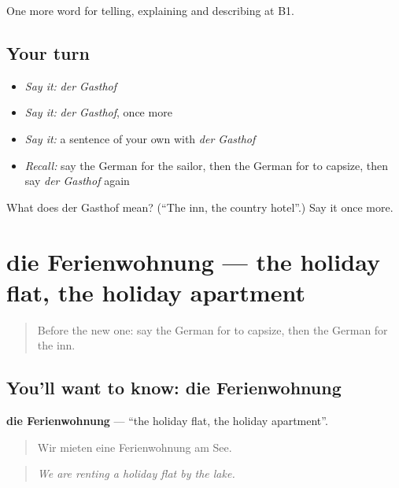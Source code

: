 \begin{grammarlens}[title={What you've built}]
One more word for telling, explaining and describing at B1.
\end{grammarlens}

\subsection*{Your turn}
\begin{itemize}
\raggedright
  \item \emph{Say it:} \emph{der Gasthof}
  \item \emph{Say it:} \emph{der Gasthof}, once more
  \item \emph{Say it:} a sentence of your own with \emph{der Gasthof}
  \item \emph{Recall:} say the German for the sailor, then the German for to capsize, then say \emph{der Gasthof} again
\end{itemize}

\begin{tcolorbox}[breakable,colback=teal!4,colframe=teal!35!black,title={Before you move on}]
What does der Gasthof mean? (\textquotedblleft{}The inn, the country hotel\textquotedblright{}.) Say it once more.
\end{tcolorbox}
\section[die Ferienwohnung]{die Ferienwohnung — the holiday flat, the holiday apartment}

\label{lesson:GE-C424-ferienwohnung}



\begin{quote}
Before the new one: say the German for to capsize, then the German for the inn.
\end{quote}

\subsection*{You'll want to know: die Ferienwohnung}
\textbf{die Ferienwohnung} — \textquotedblleft{}the holiday flat, the holiday apartment\textquotedblright{}.

\begin{quote}
Wir mieten eine Ferienwohnung am See.
\end{quote}

\begin{quote}
\emph{We are renting a holiday flat by the lake.}
\end{quote}

